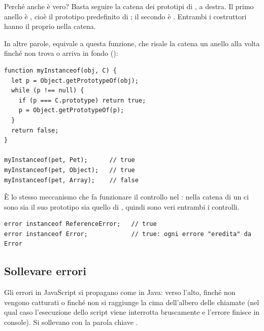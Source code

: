 Perché anche  è vero? Basta seguire la catena dei
prototipi di , a destra. Il primo anello è , cioè il
prototipo predefinito di ; il secondo è .
Entrambi i costruttori hanno il proprio  nella catena.


In altre parole,  equivale a questa funzione, che risale
la catena un anello alla volta finché non trova  o arriva in
fondo ():

\begin{lstlisting}[style=js, name=instanceof-a-mano.js]
function myInstanceof(obj, C) {
  let p = Object.getPrototypeOf(obj);
  while (p !== null) {
    if (p === C.prototype) return true;
    p = Object.getPrototypeOf(p);
  }
  return false;
}

myInstanceof(pet, Pet);      // true
myInstanceof(pet, Object);   // true
myInstanceof(pet, Array);    // false
\end{lstlisting}

È lo stesso meccanismo che fa funzionare il controllo nel : nella
catena di un  ci sono sia il suo prototipo sia quello di
, quindi sono veri entrambi i controlli.

\begin{lstlisting}[style=js]
error instanceof ReferenceError;   // true
error instanceof Error;            // true: ogni errore "eredita" da Error
\end{lstlisting}

\subsection{Sollevare errori}

Gli errori in JavaScript si propagano come in Java: verso l'alto, finché non
vengono catturati o finché non si raggiunge la cima dell'albero delle chiamate
(nel qual caso l'esecuzione dello script viene interrotta bruscamente e l'errore
finisce in console). Si sollevano con la parola chiave .

